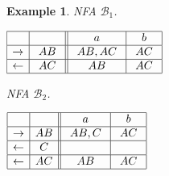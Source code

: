 \documentclass[preprint,12pt]{elsarticle}
\newcommand{\cB}{{\mathcal B}}
\newtheorem{example}{Example}
\begin{document}
\begin{example}
\begin{table}[hbt]
\begin{minipage}[b]{0.45\linewidth}
\caption{NFA $\cB_1$.}
\label{tab:b1}
{\footnotesize
\begin{center}
$
\begin{array}{|c| c||c| c| c|c|}    
\hline
& \ \  \ \ 
&\ \ a \ \ &\ \ b \ \   \\
\hline  
\rightarrow & \ AB \
&  \ AB,AC \  & \ AC \    \\
\hline  
\leftarrow& AC
&  \  AB \  &  AC \\
\hline  
\end{array}
$
\end{center}}
\end{minipage}
\hspace{0.4cm}
\begin{minipage}[b]{0.45\linewidth}
\caption{NFA $\cB_2$.}
\label{tab:b2}
{\footnotesize
\begin{center}
$
\begin{array}{|c| c||c| c| }    
\hline
& \ \  \ \ 
&\ \ a \ \ &\ \ b \ \ \\
\hline  
\rightarrow & AB
& \ AB,C \ & \ AC \ \\
\hline  
\leftarrow& \ C \
&  & \\
\hline  
\leftarrow & AC
 &  AB &  AC  \\
\hline  
\end{array}
$
\end{center}}
\end{minipage}
\end{table}





\end{example}
\end{document}
